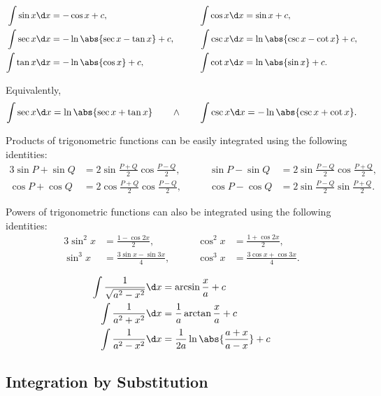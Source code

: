 \begin{proposition}
    \begin{alignat*}{3}
        \int \sin x \d x &= -\cos x + c, \qquad & \int \cos x \d x &= \sin x + c,\\
        \int \sec x \d x &= -\ln \abs{\sec x - \tan x} + c, \qquad & \int \csc x \d x &= \ln \abs{\csc x - \cot x} + c,\\
        \int \tan x \d x &= -\ln \abs{\cos x} + c, \qquad & \int \cot x \d x &= \ln \abs{\sin x} + c.
    \end{alignat*}
\end{proposition}

Equivalently, \[\int \sec x \d x = \ln \abs{\sec x + \tan x} \qquad \land \qquad \int \csc x \d x = -\ln \abs{\csc x + \cot x}.\]

Products of trigonometric functions can be easily integrated using the following identities:
\begin{alignat*}{3}
    \sin P + \sin Q &= 2 \sin \frac{P + Q}{2} \cos \frac{P - Q}{2}, \qquad & \sin P - \sin Q &= 2 \sin \frac{P - Q}{2} \cos \frac{P + Q}{2},\\
    \cos P + \cos Q &= 2 \cos \frac{P + Q}{2} \cos \frac{P - Q}{2}, \qquad & \cos P - \cos Q &= 2 \sin \frac{P - Q}{2} \sin \frac{P + Q}{2}.
\end{alignat*}

Powers of trigonometric functions can also be integrated using the following identities:
\begin{alignat*}{3}
    \sin^2 x &= \frac{1 - \cos 2x}{2}, \qquad & \cos^2 x &= \frac{1 + \cos 2x}{2},\\
    \sin^3 x &= \frac{3\sin x - \sin 3x}{4}, \qquad & \cos^3 x &= \frac{3\cos x + \cos 3x}{4}.
\end{alignat*}

\begin{proposition}
    \begin{align*}
        \int \frac1{\sqrt{a^2 - x^2}} \d x &= \arcsin \frac{x}{a} + c\\
        \int \frac1{a^2 + x^2} \d x &= \frac1{a} \arctan \frac{x}{a} + c\\
        \int \frac1{a^2 - x^2} \d x &= \frac1{2a} \ln \abs{\frac{a + x}{a-x}} + c
    \end{align*}
\end{proposition}

\subsection{Integration by Substitution}

